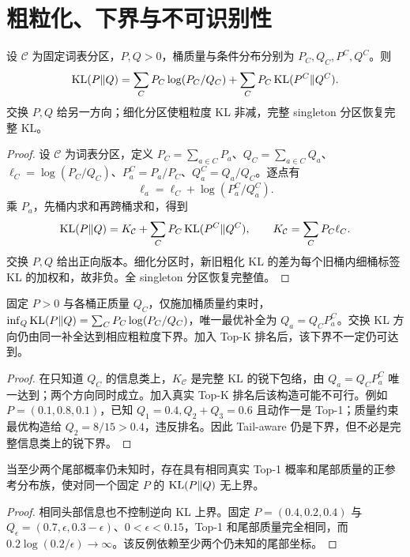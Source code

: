\section{粗粒化、下界与不可识别性}
\begin{theorem}[分区链式分解与细化单调性]
设 $\mathcal C$ 为固定词表分区，$P,Q>0$，桶质量与条件分布分别为 $P_C,Q_C,P^C,Q^C$。则
\begin{equation}
\operatorname{KL}(P\Vert Q)=\sum_CP_C\log(P_C/Q_C)+\sum_CP_C\operatorname{KL}(P^C\Vert Q^C).
\end{equation}
交换 $P,Q$ 给另一方向；细化分区使粗粒度 KL 非减，完整 singleton 分区恢复完整 KL。
\end{theorem}
\begin{proof}
设 $\mathcal C$ 为词表分区，定义 $P_C=\sum_{a\in C}P_a$、$Q_C=\sum_{a\in C}Q_a$、$\ell_C=\log(P_C/Q_C)$、$P^C_a=P_a/P_C$、$Q^C_a=Q_a/Q_C$。逐点有
\begin{equation}
\ell_a=\ell_C+\log(P_a^C/Q_a^C).
\end{equation}
乘 $P_a$，先桶内求和再跨桶求和，得到
\begin{equation}
\operatorname{KL}(P\Vert Q)=K_{\mathcal C}+\sum_CP_C\operatorname{KL}(P^C\Vert Q^C),
\qquad K_{\mathcal C}=\sum_CP_C\ell_C.
\label{eq:partition-chain}
\end{equation}
交换 $P,Q$ 给出正向版本。细化分区时，新旧粗化 KL 的差为每个旧桶内细桶标签 KL 的加权和，故非负。全 singleton 分区恢复完整值。
\end{proof}

\begin{proposition}
固定 $P>0$ 与各桶正质量 $Q_C$，仅施加桶质量约束时，$\inf_Q\operatorname{KL}(P\Vert Q)=\sum_CP_C\log(P_C/Q_C)$，唯一最优补全为 $Q_a=Q_CP_a^C$。交换 KL 方向仍由同一补全达到相应粗粒度下界。加入 Top-K 排名后，该下界不一定仍可达到。
\end{proposition}
\begin{proof}
在只知道 $Q_C$ 的信息类上，$K_{\mathcal C}$ 是完整 KL 的锐下包络，由 $Q_a=Q_CP_a^C$ 唯一达到；两个方向同时成立。加入真实 Top-K 排名后该构造可能不可行。例如 $P=(0.1,0.8,0.1)$，已知 $Q_1=0.4,Q_2+Q_3=0.6$ 且动作一是 Top-1；质量约束最优构造给 $Q_2=8/15>0.4$，违反排名。因此 Tail-aware 仍是下界，但不必是完整信息类上的锐下界。
\end{proof}

\begin{proposition}[稀疏头部信息不控制完整逆向 KL 上界]
当至少两个尾部概率仍未知时，存在具有相同真实 Top-1 概率和尾部质量的正参考分布族，使对同一个固定 $P$ 的 $\operatorname{KL}(P\Vert Q)$ 无上界。
\end{proposition}
\begin{proof}
相同头部信息也不控制逆向 KL 上界。固定 $P=(0.4,0.2,0.4)$ 与 $Q_\epsilon=(0.7,\epsilon,0.3-\epsilon)$、$0<\epsilon<0.15$，Top-1 和尾部质量完全相同，而 $0.2\log(0.2/\epsilon)\to\infty$。该反例依赖至少两个仍未知的尾部坐标。
\end{proof}

